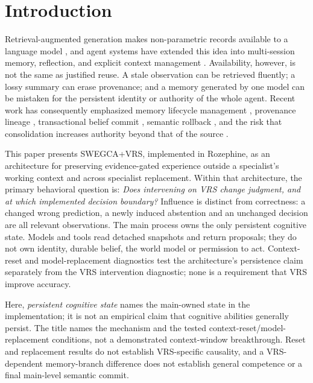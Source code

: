 \documentclass[11pt]{article}
\newcommand{\system}{Rozephine}
\newcommand{\swegca}{SWEGCA}
\newcommand{\vrs}{VRS}
\begin{document}
\section{Introduction}

Retrieval-augmented generation makes non-parametric records available to a language model \cite{lewis2020rag}, and agent systems have extended this idea into multi-session memory, reflection, and explicit context management \cite{park2023generative,packer2023memgpt,sumers2024coala}.  Availability, however, is not the same as justified reuse.  A stale observation can be retrieved fluently; a lossy summary can erase provenance; and a memory generated by one model can be mistaken for the persistent identity or authority of the whole agent.  Recent work has consequently emphasized memory lifecycle management \cite{li2025memos}, provenance lineage \cite{ouyang2026memlineage,xu2026provenance}, transactional belief commit \cite{li2026memtx}, semantic rollback \cite{su2026chronomem}, and the risk that consolidation increases authority beyond that of the source \cite{zhan2026authority}.

This paper presents \swegca{}+\vrs, implemented in \system, as an architecture for preserving evidence-gated experience outside a specialist's working context and across specialist replacement. Within that architecture, the primary behavioral question is: \emph{Does intervening on VRS change judgment, and at which implemented decision boundary?} Influence is distinct from correctness: a changed wrong prediction, a newly induced abstention and an unchanged decision are all relevant observations. The main process owns the only persistent cognitive state. Models and tools read detached snapshots and return proposals; they do not own identity, durable belief, the world model or permission to act. Context-reset and model-replacement diagnostics test the architecture's persistence claim separately from the VRS intervention diagnostic; none is a requirement that VRS improve accuracy.

Here, \emph{persistent cognitive state} names the main-owned state in the implementation; it is not an empirical claim that cognitive abilities generally persist. The title names the mechanism and the tested context-reset/model-replacement conditions, not a demonstrated context-window breakthrough. Reset and replacement results do not establish VRS-specific causality, and a VRS-dependent memory-branch difference does not establish general competence or a final main-level semantic commit.
\end{document}
